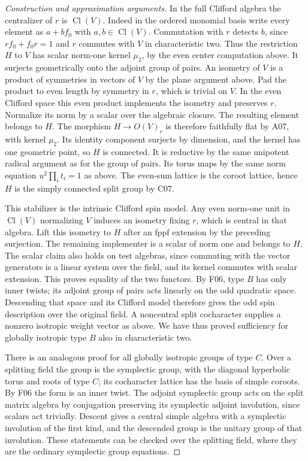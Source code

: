 \documentclass[11pt,a4paper,openany,oneside]{book}
\theoremstyle{resultstyle}
\theoremstyle{definition}
\numberwithin{equation}{chapter}
\begin{document}
\begin{proof}[Construction and approximation arguments]
In the full Clifford algebra the centralizer of \(r\)
is \(\operatorname{Cl}(V)\). Indeed in the ordered
monomial basis write every element as \(a+bf_0\)
with \(a,b\in\operatorname{Cl}(V)\). Commutation with
\(r\) detects \(b\), since \(rf_0+f_0r=1\) and
\(r\) commutes with \(V\) in characteristic two.
Thus the restriction \(H\) to \(V\) has scalar
norm-one kernel \(\mu_2\), by the even center computation
above. It surjects geometrically onto the adjoint group
of pairs. An isometry of \(V\) is a product of symmetries
in vectors of \(V\) by the plane argument above.
Pad the product to even length by symmetry in \(r\),
which is trivial on \(V\). In the even Clifford space
this even product implements the isometry and preserves
\(r\). Normalize its norm by a scalar over the algebraic
closure. The resulting element belongs to \(H\).
The morphism \(H\to O(V)_r\) is therefore faithfully
flat by A07, with kernel \(\mu_2\). Its identity component
surjects by dimension, and the kernel has one geometric
point, so \(H\) is connected. It is reductive by the
same unipotent radical argument as for the group of pairs.
Its torus maps by the same norm equation
\(u^2\prod_i t_i=1\) as above. The even-sum lattice
is the coroot lattice, hence \(H\) is the simply
connected split group by C07.

This stabilizer is the intrinsic Clifford spin model.
Any even norm-one unit in \(\operatorname{Cl}(V)\)
normalizing \(V\) induces an isometry fixing \(r\),
which is central in that algebra. Lift this isometry
to \(H\) after an fppf extension by the preceding
surjection. The remaining implementer is a scalar of
norm one and belongs to \(H\). The scalar claim also
holds on test algebras, since commuting with the vector
generators is a linear system over the field, and its
kernel commutes with scalar extension. This proves
equality of the two functors. By F06, type \(B\) has
only inner twists; its adjoint group of pairs acts
linearly on the odd quadratic space. Descending that
space and its Clifford model therefore gives the
odd spin description over the original field.
A noncentral split cocharacter supplies a nonzero
isotropic weight vector as above. We have thus
proved sufficiency for globally isotropic type \(B\)
also in characteristic two.

There is an analogous proof for all globally isotropic groups
of type \(C\). Over a splitting field the group is the
symplectic group, with the
diagonal hyperbolic torus and roots of type \(C\); its
cocharacter lattice has the basis of simple coroots.
By F06 the form is an inner twist. The adjoint symplectic
group acts on the split matrix algebra by conjugation
preserving its symplectic adjoint involution, since scalars
act trivially. Descent gives a central simple algebra with
a symplectic involution of the first kind, and the descended
group is the unitary group of that involution. These statements
can be checked over the splitting field, where they are the
ordinary symplectic group equations.


\end{proof}
\end{document}
